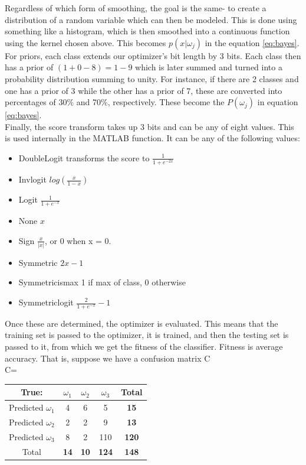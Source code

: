 Regardless of which form of smoothing, the goal is the same- to create a
distribution of a random variable which can then be modeled.  This is done using
something like a histogram, which is then smoothed into a continuous function
using the kernel chosen above.  This becomes $p(x|\omega_j)$ in the equation
\ref{eq:bayes}.\\
For priors, each class extends our optimizer's bit length by 3 bits.  Each class
then has a prior of $(1 + 0-8)= 1-9$ which is later summed and turned into a
probability distribution summing to unity.  For instance, if there are 2 classes
and one has a prior of 3 while the other has a prior of 7, these are converted
into percentages of 30\% and 70\%, respectively.  These become the $P(\omega_j)$
in equation \ref{eq:bayes}.\\
Finally, the score transform takes up 3 bits and can be any of eight values. 
This is used internally in the MATLAB function.  It can be any of the following
values:
\begin{itemize}
	\item DoubleLogit transforms the score to $\frac{1}{1+e^{-2x}}$
	\item Invlogit $log(\frac{x}{1-x})$
	\item Logit $\frac{1}{1+e^{-x}}$
	\item None $x$
	\item Sign $\frac{x}{|x|}$, or 0 when x = 0.
	\item Symmetric $2x-1$
	\item Symmetricismax 1 if max of class, 0 otherwise
	\item Symmetriclogit $\frac{2}{1+e^{-x}}-1$
\end{itemize}
Once these are determined, the optimizer is evaluated.  This means that the training set is passed to the optimizer, it is trained, and then the testing set is passed to it, from which we get the fitness of the classifier.  Fitness is average accuracy.  That is, suppose we have a confusion matrix C\\
C= \begin{tabular}{|c|c|c|c|c|}
	\hline
	True:&$\omega_1$&$\omega_2$&$\omega_3$&\textbf{Total}\\
	\hline
	Predicted $\omega_1$&4&6&5&\textbf{15}\\
	\hline
	Predicted $\omega_2$&2&2&9&\textbf{13}\\
	\hline
	Predicted $\omega_3$&8&2&110&\textbf{120}\\
	\hline
	Total&\textbf{14}&\textbf{10}&\textbf{124}&\textbf{148}\\
	\hline
\end{tabular} 
